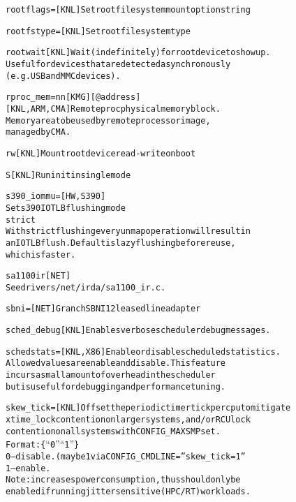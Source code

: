 \documentclass[a4paper,8pt,english]{sphinxmanual}
\begin{document}
\begin{alltt}
        rootflags=      {[}KNL{]} Set root filesystem mount option string

        rootfstype=     {[}KNL{]} Set root filesystem type

        rootwait        {[}KNL{]} Wait (indefinitely) for root device to show up.
                        Useful for devices that are detected asynchronously
                        (e.g. USB and MMC devices).

        rproc\_mem=nn{[}KMG{]}{[}@address{]}
                        {[}KNL,ARM,CMA{]} Remoteproc physical memory block.
                        Memory area to be used by remote processor image,
                        managed by CMA.

        rw              {[}KNL{]} Mount root device read-write on boot

        S               {[}KNL{]} Run init in single mode

        s390\_iommu=     {[}HW,S390{]}
                        Set s390 IOTLB flushing mode
                strict
                        With strict flushing every unmap operation will result in
                        an IOTLB flush. Default is lazy flushing before reuse,
                        which is faster.

        sa1100ir        {[}NET{]}
                        See drivers/net/irda/sa1100\_ir.c.

        sbni=           {[}NET{]} Granch SBNI12 leased line adapter

        sched\_debug     {[}KNL{]} Enables verbose scheduler debug messages.

        schedstats=     {[}KNL,X86{]} Enable or disable scheduled statistics.
                        Allowed values are enable and disable. This feature
                        incurs a small amount of overhead in the scheduler
                        but is useful for debugging and performance tuning.

        skew\_tick=      {[}KNL{]} Offset the periodic timer tick per cpu to mitigate
                        xtime\_lock contention on larger systems, and/or RCU lock
                        contention on all systems with CONFIG\_MAXSMP set.
                        Format: \{ ``0'' \textbar{} ``1'' \}
                        0 -- disable. (may be 1 via CONFIG\_CMDLINE=''skew\_tick=1''
                        1 -- enable.
                        Note: increases power consumption, thus should only be
                        enabled if running jitter sensitive (HPC/RT) workloads.


\end{alltt}
\end{document}
